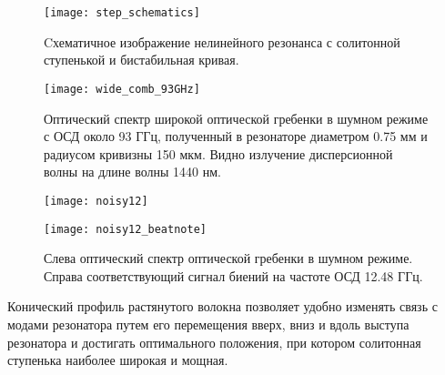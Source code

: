 \begin{figure}[ht]
\centering
  \texttt{[image: step\_schematics]}
  \caption{Cхематичное изображение нелинейного резонанса с солитонной ступенькой и бистабильная кривая. }
  \label{step_schematics}
\end{figure}

\begin{figure}[ht]
\centering
  \texttt{[image: wide\_comb\_93GHz]}
  \caption{Оптический спектр широкой оптической гребенки в шумном режиме с ОСД около 93 ГГц, полученный в резонаторе диаметром 0.75 мм и радиусом кривизны 150 мкм. Видно излучение дисперсионной волны на длине волны 1440 нм.}
  \label{wide_comb_93GHz}
\end{figure}

\begin{figure}[ht]
  \begin{minipage}[ht]{0.49\linewidth}\centering
    \texttt{[image: noisy12]}
  \end{minipage}
  \hfill
  \begin{minipage}[ht]{0.49\linewidth}\centering
    \texttt{[image: noisy12\_beatnote]}
  \end{minipage}
  \caption{Слева оптический спектр оптической гребенки в шумном режиме. Справа соответствующий сигнал биений на частоте ОСД 12.48 ГГц.}
  \label{noisy12}
\end{figure}

Конический профиль растянутого волокна позволяет удобно изменять связь с модами резонатора путем его перемещения вверх, вниз и вдоль выступа резонатора и достигать оптимального положения, при котором солитонная ступенька наиболее широкая и мощная.

